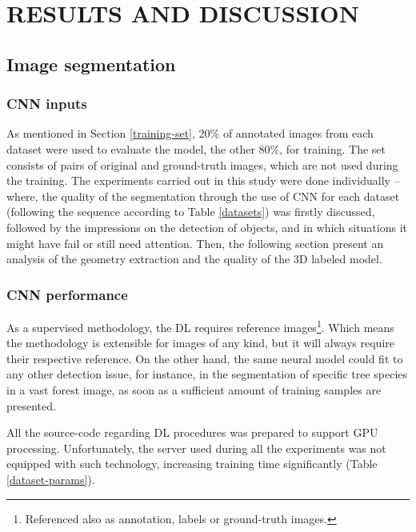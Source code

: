 \chapter{RESULTS AND DISCUSSION}\label{chapter4}

\section{Image segmentation}

\subsection{CNN inputs}
As mentioned in Section \ref{training-set}, 20\% of annotated images from each dataset were used to evaluate the model, the other 80\%, for training. The set consists of pairs of original and ground-truth images, which are not used during the training. The experiments carried out in this study were done individually -- where, the quality of the segmentation through the use of CNN for each dataset (following the sequence according to Table \ref{datasets}) was firstly discussed, followed by the impressions on the detection of objects, and in which situations it might have fail or still need attention. Then, the following section present an analysis of the geometry extraction and the quality of the 3D labeled model.

\subsection{CNN performance}
As a supervised methodology, the DL requires reference images\footnote{Referenced also as annotation, labels or ground-truth images.}. Which means the methodology is extensible for images of any kind, but it will always require their respective reference. On the other hand, the same neural model could fit to any other detection issue, for instance, in the segmentation of specific tree species in a vast forest image, as soon as a sufficient amount of training samples are presented.

All the source-code regarding DL procedures was prepared to support GPU processing. Unfortunately, the server used during all the experiments was not equipped with such technology, increasing training time significantly (Table \ref{dataset-params}).

